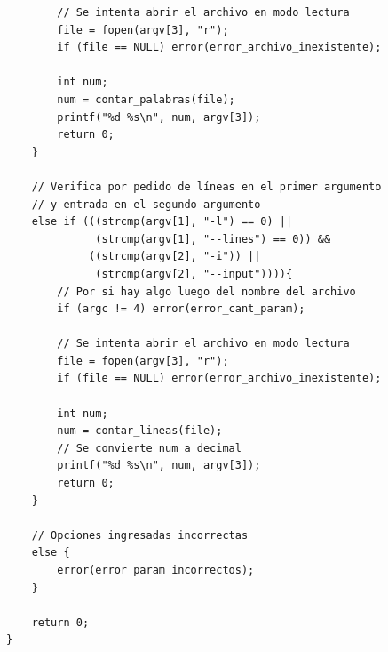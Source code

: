 \documentclass[a4paper, 10pt, twoside, notitlepage]{article}
\begin{document}
\begin{verbatim}
        // Se intenta abrir el archivo en modo lectura
        file = fopen(argv[3], "r");
        if (file == NULL) error(error_archivo_inexistente);

        int num;
        num = contar_palabras(file);
        printf("%d %s\n", num, argv[3]);
        return 0;
    }

    // Verifica por pedido de líneas en el primer argumento 
    // y entrada en el segundo argumento
    else if (((strcmp(argv[1], "-l") == 0) || 
              (strcmp(argv[1], "--lines") == 0)) && 
             ((strcmp(argv[2], "-i")) || 
              (strcmp(argv[2], "--input")))){
        // Por si hay algo luego del nombre del archivo
        if (argc != 4) error(error_cant_param);

        // Se intenta abrir el archivo en modo lectura
        file = fopen(argv[3], "r");
        if (file == NULL) error(error_archivo_inexistente);

        int num;
        num = contar_lineas(file);
        // Se convierte num a decimal
        printf("%d %s\n", num, argv[3]);
        return 0;
    }     

    // Opciones ingresadas incorrectas
    else {
        error(error_param_incorrectos);
    }

    return 0;
}
\end{verbatim}
\end{document}
